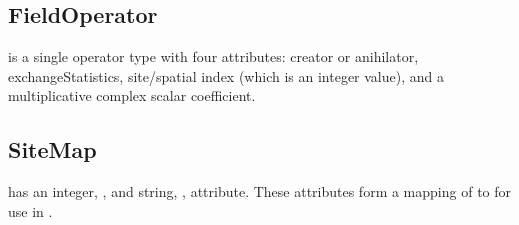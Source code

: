 \subsection{\textbf{FieldOperator}}\label{subsec:FieldOperator}
 is a single operator type with four attributes: creator or anihilator, exchangeStatistics, site/spatial index (which is an integer value), and a multiplicative complex scalar coefficient.\\

\subsection{\textbf{SiteMap}}\label{subsec:Sitemap}
 has an integer, , and string, , attribute. These attributes form a mapping of  to  for use in \Clang.


